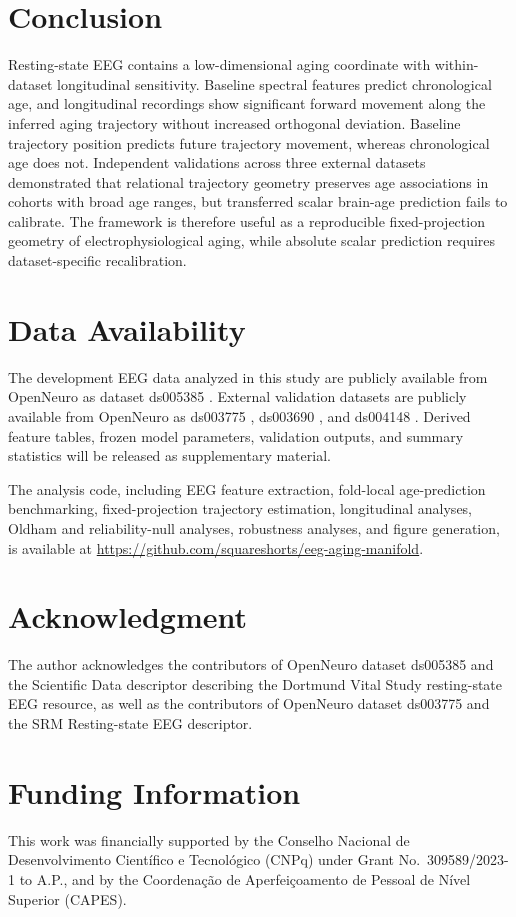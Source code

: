 \documentclass[journal]{IEEEtran}
\begin{document}
\section{Conclusion}

Resting-state EEG contains a low-dimensional aging coordinate with within-dataset longitudinal sensitivity. Baseline spectral features predict chronological age, and longitudinal recordings show significant forward movement along the inferred aging trajectory without increased orthogonal deviation. Baseline trajectory position predicts future trajectory movement, whereas chronological age does not. Independent validations across three external datasets demonstrated that relational trajectory geometry preserves age associations in cohorts with broad age ranges, but transferred scalar brain-age prediction fails to calibrate. The framework is therefore useful as a reproducible fixed-projection geometry of electrophysiological aging, while absolute scalar prediction requires dataset-specific recalibration.

\section*{Data Availability}

The development EEG data analyzed in this study are publicly available from OpenNeuro as dataset ds005385 \cite{openneuro_ds005385,getzmann2024resting}. External validation datasets are publicly available from OpenNeuro as ds003775 \cite{openneuro_ds003775,hatlestad2022bids}, ds003690 \cite{openneuro_ds003690}, and ds004148 \cite{openneuro_ds004148}. Derived feature tables, frozen model parameters, validation outputs, and summary statistics will be released as supplementary material.

The analysis code, including EEG feature extraction, fold-local age-prediction benchmarking, fixed-projection trajectory estimation, longitudinal analyses, Oldham and reliability-null analyses, robustness analyses, and figure generation, is available at \url{https://github.com/squareshorts/eeg-aging-manifold}.

\section*{Acknowledgment}

The author acknowledges the contributors of OpenNeuro dataset ds005385 and the Scientific Data descriptor describing the Dortmund Vital Study resting-state EEG resource, as well as the contributors of OpenNeuro dataset ds003775 and the SRM Resting-state EEG descriptor.

\section*{Funding Information}

This work was financially supported by the Conselho Nacional de Desenvolvimento Cient\'ifico e Tecnol\'ogico (CNPq) under Grant No.~309589/2023-1 to A.P., and by the Coordena\c{c}\~ao de Aperfei\c{c}oamento de Pessoal de N\'ivel Superior (CAPES).



\end{document}
